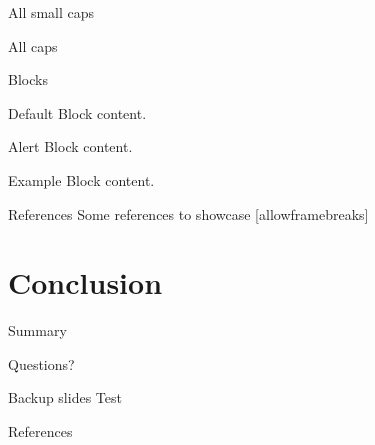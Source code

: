 \documentclass[10pt]{beamer}
\begin{document}
{
\begin{frame}{All small caps}

\end{frame}
}
{
\begin{frame}{All caps}

\end{frame}
}

\begin{frame}{Blocks}
 

      \begin{block}{Default}
        Block content.
      \end{block}

      \begin{alertblock}{Alert}
        Block content.
      \end{alertblock}

      \begin{exampleblock}{Example}
        Block content.
      \end{exampleblock}


\end{frame}

\begin{frame}{References}
  Some references to showcase [allowframebreaks] \cite{knuth92,ConcreteMath,Simpson,Er01,greenwade93}
\end{frame}
\section{Conclusion}

\begin{frame}{Summary}

\end{frame}

{
\begin{frame}[standout]
  Questions?
\end{frame}
}

\appendix
\begin{frame}[fragile]{Backup slides}
Test
\end{frame}

\begin{frame}[allowframebreaks]{References}

  
  

\end{frame}
\end{document}
